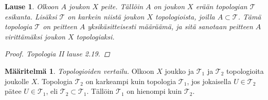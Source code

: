 \documentclass[12pt,a4paper,leqno]{report}
\newcommand{\T}{\mathcal{T}}
\theoremstyle{plain}
\newtheorem{lause}[equation]{Lause}
\theoremstyle{definition}
\newtheorem{maar}[equation]{Määritelmä}
\theoremstyle{remark}
\begin{document}
\begin{lause}
Olkoon $A$ joukon $X$ peite. Tällöin $A$ on joukon $X$ erään topologian $\T$ esikanta. 
Lisäksi $\T$ on karkein niistä joukon $X$ topologioista, joilla $A\subset\T$. 
Tämä topologia $\T$ on peitteen $A$ yksikäsitteisesti määräämä, ja sitä sanotaan peitteen $A$ virittämäksi joukon $X$ topologiaksi.
\begin{proof}
Topologia II \cite{Topo2} lause 2.19.
\end{proof}
\end{lause}
\begin{maar}
\emph{Topologioiden vertailu.}
Olkoon $X$ joukko ja $\T_1$ ja $\T_2$ topologioita joukolle $X$.
Topologia $\T_2$ on karkeampi kuin topologia $\T_1$, 
jos jokaisella $ U\in\T_2$ pätee $ U\in\T_1$, eli $ \T_2\subset\T_1$. 
Tällöin $\T_1$ on hienompi kuin $\T_2$.
\end{maar}
\end{document}
